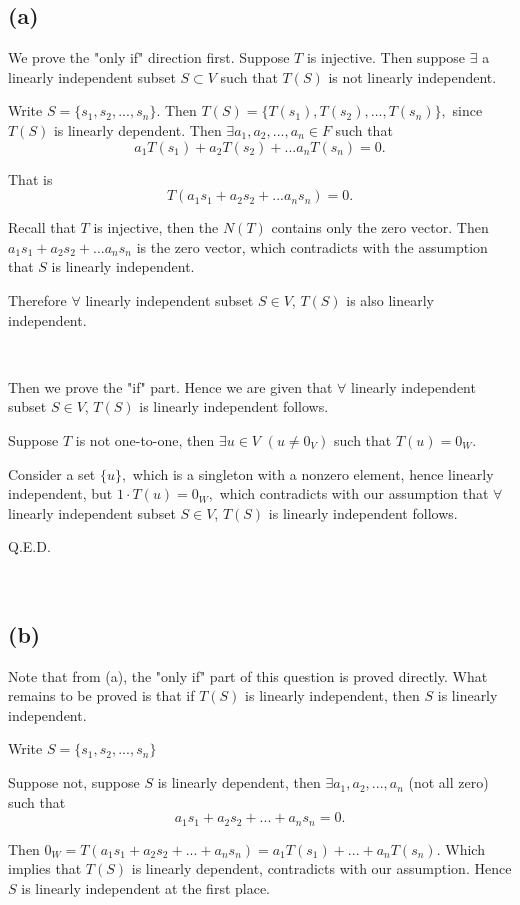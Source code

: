 \documentclass[12pt]{article}%
\begin{document}
\subsection{(a)}

We prove the "only if" direction first. Suppose $T$ is injective. Then suppose $\exists$ a linearly independent subset $S \subset V$ such that $T(S)$ is not linearly independent.

Write $S=\{s_1,s_2,...,s_n\}.$ Then $T(S)=\{T(s_1),T(s_2),...,T(s_n)\},$ since $T(S)$ is linearly dependent. Then $\exists a_1,a_2,...,a_n \in F$ such that $$a_1T(s_1)+a_2T(s_2)+...a_nT(s_n)=0.$$

That is $$T(a_1s_1+a_2s_2+...a_ns_n)=0.$$

Recall that $T$ is injective, then the $N(T)$ contains only the zero vector. Then $a_1s_1+a_2s_2+...a_ns_n$ is the zero vector, which contradicts with the assumption that $S$ is linearly independent.

Therefore $\forall$ linearly independent subset $S \in V$, $T(S)$ is also linearly independent. 

~\ 

Then we prove the "if" part. Hence we are given that $\forall$ linearly independent subset $S \in V$, $T(S)$ is linearly independent follows.

Suppose $T$ is not one-to-one, then $\exists u\in V$ $(u\neq 0_V)$ such that $T(u)=0_W.$ 

Consider a set $\{u\},$ which is a singleton with a nonzero element, hence linearly independent, but $1\cdot T(u)=0_W,$ which contradicts with our assumption that $\forall$ linearly independent subset $S \in V$, $T(S)$ is linearly independent follows. 

Q.E.D.

~\

\subsection{(b)}

Note that from (a), the "only if" part of this question is proved directly. What remains to be proved is that if $T(S)$ is linearly independent, then $S$ is linearly independent. 

Write $S=\{s_1,s_2,...,s_n\}$

Suppose not, suppose $S$ is linearly dependent, then $\exists a_1,a_2,...,a_n$ (not all zero) such that $$a_1s_1+a_2s_2+...+a_ns_n=0.$$

Then $0_W=T(a_1s_1+a_2s_2+...+a_ns_n)=a_1T(s_1)+...+a_nT(s_n).$ Which implies that $T(S)$ is linearly dependent, contradicts with our assumption. Hence $S$ is linearly independent at the first place.
\end{document}
